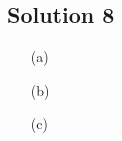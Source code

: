 \subsection*{Solution 8}

\begin{itemize}
\item[(a)]
\todo
\item[(b)]
\todo
\item[(c)]
\todo
\end{itemize}

